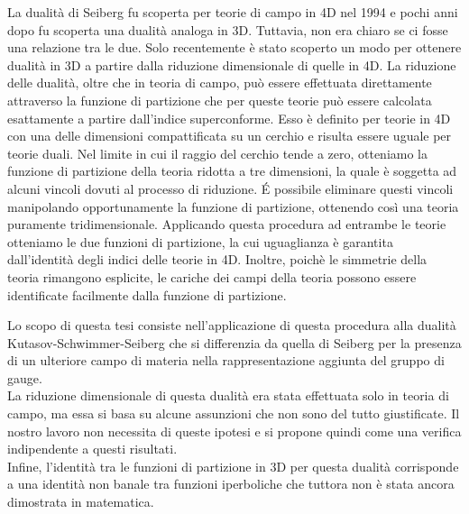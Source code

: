 \documentclass[a4paper,oneside,11pt]{article}
\begin{document}
La dualità di Seiberg fu scoperta per teorie di campo in 4D nel 1994 e pochi anni dopo fu scoperta una dualità analoga in 3D.
Tuttavia, non era chiaro se ci fosse una relazione tra le due.
Solo recentemente è stato scoperto un modo per ottenere dualità in 3D a partire dalla riduzione dimensionale di quelle in 4D.
La riduzione delle dualità, oltre che in teoria di campo, può essere effettuata direttamente attraverso la funzione di partizione che per queste teorie può essere calcolata esattamente a partire dall'indice superconforme.
Esso è definito per teorie in 4D con una delle dimensioni compattificata su un cerchio e risulta essere uguale per teorie duali.
Nel limite in cui il raggio del cerchio tende a zero, otteniamo la funzione di partizione della teoria ridotta a tre dimensioni, la quale è soggetta ad alcuni vincoli dovuti al processo di riduzione.
\'E possibile eliminare questi vincoli manipolando opportunamente la funzione di partizione, ottenendo così una teoria puramente tridimensionale. 
Applicando questa procedura ad entrambe le teorie otteniamo le due funzioni di partizione, la cui uguaglianza è garantita dall'identità degli indici delle teorie in 4D.
Inoltre, poichè le simmetrie della teoria rimangono esplicite, le cariche dei campi della teoria possono essere identificate facilmente dalla funzione di partizione.

Lo scopo di questa tesi consiste nell'applicazione di questa procedura alla dualità Kutasov-Schwimmer-Seiberg che si differenzia da quella di Seiberg per la presenza di un ulteriore campo di materia nella rappresentazione aggiunta del gruppo di gauge. \\
La riduzione dimensionale di questa dualità era stata effettuata solo in teoria di campo, ma essa si basa su alcune assunzioni che non sono del tutto giustificate.
Il nostro lavoro non necessita di queste ipotesi e si propone quindi come una verifica indipendente a questi risultati.
\\
Infine, l'identità tra le funzioni di partizione in 3D per questa dualità corrisponde a una identità non banale tra funzioni iperboliche che tuttora non è stata ancora dimostrata in matematica.
\end{document}
